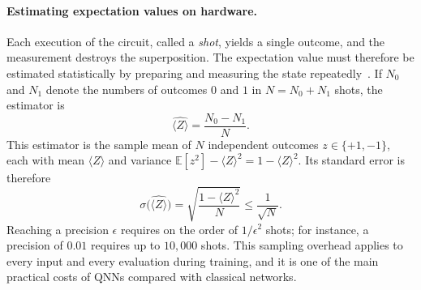 \documentclass[12pt]{article}
\numberwithin{equation}{section}  %
\begin{document}
\paragraph{Estimating expectation values on hardware.} Each execution of the circuit, called a \emph{shot}, yields a single outcome, and the measurement destroys the superposition. The expectation value must therefore be estimated statistically by preparing and measuring the state repeatedly~\cite{mitarai2018quantum, benedetti2019parameterized}. If $N_0$ and $N_1$ denote the numbers of outcomes $0$ and $1$ in $N = N_0 + N_1$ shots, the estimator is
\begin{equation}
\widehat{\langle Z \rangle} = \frac{N_0 - N_1}{N}.
\label{eq:z_estimator}
\end{equation}
This estimator is the sample mean of $N$ independent outcomes $z \in \{+1, -1\}$, each with mean $\langle Z \rangle$ and variance $\mathbb{E}[z^2] - \langle Z \rangle^2 = 1 - \langle Z \rangle^2$. Its standard error is therefore
\begin{equation}
\sigma\bigl(\widehat{\langle Z \rangle}\bigr) = \sqrt{\frac{1 - \langle Z \rangle^2}{N}} \leq \frac{1}{\sqrt{N}}.
\end{equation}
Reaching a precision $\epsilon$ requires on the order of $1/\epsilon^2$ shots; for instance, a precision of $0.01$ requires up to $10{,}000$ shots. This sampling overhead applies to every input and every evaluation during training, and it is one of the main practical costs of QNNs compared with classical networks.
\end{document}
